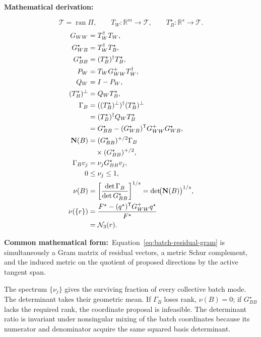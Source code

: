 \documentclass[10pt,twocolumn]{article}
\newcommand{\form}[1]{\par\noindent\textbf{Common mathematical form:}\ #1\par}
\begin{document}
\par\noindent\textbf{Mathematical derivation:}\par
\[
\mathcal T=\operatorname{ran}\Pi,
\qquad
T_W:\mathbb R^m\to\mathcal T,
\qquad
T_B^\star:\mathbb R^s\to\mathcal T.
\]
\begin{align}
G_{WW}&=T_W^\dagger T_W,
\notag\\
G_{WB}^\star&=T_W^\dagger T_B^\star,
\notag\\
G_{BB}^\star&=(T_B^\star)^\dagger T_B^\star,
\notag\\
P_W&=T_WG_{WW}^+T_W^\dagger,
\notag\\
Q_W&=I-P_W,
\notag\\
(T_B^\star)^\perp&=Q_WT_B^\star,
\notag\\
\Gamma_B
&=((T_B^\star)^\perp)^\dagger(T_B^\star)^\perp
\notag\\
&=(T_B^\star)^\dagger Q_WT_B^\star
\notag\\
&=G_{BB}^\star
-(G_{WB}^\star)^{\mathsf T}G_{WW}^+G_{WB}^\star,
\label{eq:batch-residual-gram}\\
\mathbf N(B)
&=(G_{BB}^\star)^{+/2}\Gamma_B
\notag\\
&\quad\times(G_{BB}^\star)^{+/2},
\label{eq:batch-novelty-operator}\\
\Gamma_Bv_j&=\nu_jG_{BB}^\star v_j,
\notag\\
0&\le\nu_j\le1,
\notag\\
\nu(B)
&=\left[\frac{\det\Gamma_B}{\det G_{BB}^\star}\right]^{1/s}
=\det\!\bigl(\mathbf N(B)\bigr)^{1/s},
\label{eq:batch-volume-novelty}\\
\nu(\{r\})
&=\frac{F^\star-(q^\star)^{\mathsf T}G_{WW}^+q^\star}{F^\star}
\notag\\
&=\mathcal N_3(r).
\notag
\end{align}

\form{Equation~\eqref{eq:batch-residual-gram} is simultaneously a Gram matrix
of residual vectors, a metric Schur complement, and the induced metric on the
quotient of proposed directions by the active tangent span.}

The spectrum \(\{\nu_j\}\) gives the surviving fraction of every collective
batch mode. The determinant takes their geometric mean. If \(\Gamma_B\) loses
rank, \(\nu(B)=0\); if \(G_{BB}^\star\) lacks the required rank, the coordinate
proposal is infeasible. The determinant ratio is invariant under nonsingular
mixing of the batch coordinates because its numerator and denominator acquire
the same squared basis determinant.
\end{document}

